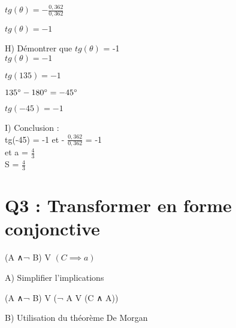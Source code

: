 $
tg(\theta) = - \frac{0,362}{0,362}
$
\vspace{5mm} %

$
tg(\theta) = -1
$
\vspace{5mm} %

H) Démontrer que $tg(\theta)$ = -1 \\

$
tg(\theta) = -1
$
\vspace{5mm} %

$
tg(135) = -1
$
\vspace{5mm} %

$
135^{\circ} -180^{\circ} = -45^{\circ} \\
$
\vspace{5mm} %

$
tg(-45) = -1
$

\vspace{10mm} %

I) Conclusion : \\

tg(-45) = -1 et - $\frac{0,362}{0,362}$ = -1 \\

et a = $\frac{4}{3}$\\

S = $\frac{4}{3}$\\


\newpage

\vspace{10mm} %

\section{Q3 : Transformer en forme conjonctive}

\vspace{4mm} %

(A ∧¬ B) V $(C\implies a)$ \\

\begin{flushleft}
A) Simplifier l’implications \\
\end{flushleft}

  (A ∧¬ B) V (¬ A V (C ∧ A))\\

\begin{flushleft}
B) Utilisation du théorème De Morgan \\
\end{flushleft}

